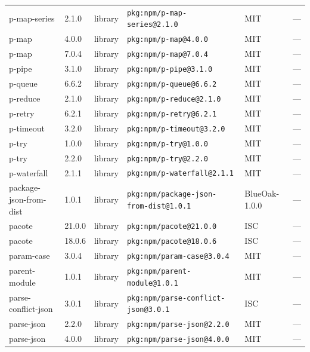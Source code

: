 \documentclass[11pt,a4paper]{article}
\begin{document}
\begin{longtable}{|p{4cm}|p{2cm}|p{1.6cm}|p{5cm}|p{1.5cm}|p{3.5cm}|}
\raggedright p-map-series & 2.1.0 & library & \small\texttt{pkg:npm/p-map-series@2.1.0} & MIT & \small — \\
\raggedright p-map & 4.0.0 & library & \small\texttt{pkg:npm/p-map@4.0.0} & MIT & \small — \\
\raggedright p-map & 7.0.4 & library & \small\texttt{pkg:npm/p-map@7.0.4} & MIT & \small — \\
\raggedright p-pipe & 3.1.0 & library & \small\texttt{pkg:npm/p-pipe@3.1.0} & MIT & \small — \\
\raggedright p-queue & 6.6.2 & library & \small\texttt{pkg:npm/p-queue@6.6.2} & MIT & \small — \\
\raggedright p-reduce & 2.1.0 & library & \small\texttt{pkg:npm/p-reduce@2.1.0} & MIT & \small — \\
\raggedright p-retry & 6.2.1 & library & \small\texttt{pkg:npm/p-retry@6.2.1} & MIT & \small — \\
\raggedright p-timeout & 3.2.0 & library & \small\texttt{pkg:npm/p-timeout@3.2.0} & MIT & \small — \\
\raggedright p-try & 1.0.0 & library & \small\texttt{pkg:npm/p-try@1.0.0} & MIT & \small — \\
\raggedright p-try & 2.2.0 & library & \small\texttt{pkg:npm/p-try@2.2.0} & MIT & \small — \\
\raggedright p-waterfall & 2.1.1 & library & \small\texttt{pkg:npm/p-waterfall@2.1.1} & MIT & \small — \\
\raggedright package-json-from-dist & 1.0.1 & library & \small\texttt{pkg:npm/package-json-from-dist@1.0.1} & BlueOak-1.0.0 & \small — \\
\raggedright pacote & 21.0.0 & library & \small\texttt{pkg:npm/pacote@21.0.0} & ISC & \small — \\
\raggedright pacote & 18.0.6 & library & \small\texttt{pkg:npm/pacote@18.0.6} & ISC & \small — \\
\raggedright param-case & 3.0.4 & library & \small\texttt{pkg:npm/param-case@3.0.4} & MIT & \small — \\
\raggedright parent-module & 1.0.1 & library & \small\texttt{pkg:npm/parent-module@1.0.1} & MIT & \small — \\
\raggedright parse-conflict-json & 3.0.1 & library & \small\texttt{pkg:npm/parse-conflict-json@3.0.1} & ISC & \small — \\
\raggedright parse-json & 2.2.0 & library & \small\texttt{pkg:npm/parse-json@2.2.0} & MIT & \small — \\
\raggedright parse-json & 4.0.0 & library & \small\texttt{pkg:npm/parse-json@4.0.0} & MIT & \small — \\

\end{longtable}
\end{document}
